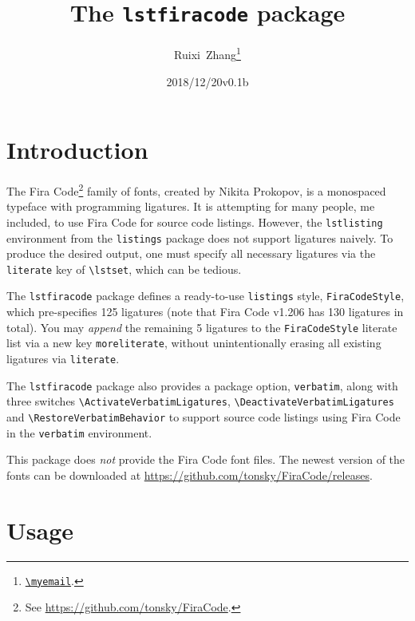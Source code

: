 \documentclass[11pt]{article}
\title{The \texttt{lstfiracode} package}
\author{Ruixi~Zhang\thanks{\href{mailto:\myemail}{\nolinkurl{\myemail}}.}}
\date{2018/12/20\enskip v0.1b}
\begin{document}
\maketitle

\tableofcontents
{}

\section{Introduction}

The Fira Code\footnote{See \url{https://github.com/tonsky/FiraCode}.} family
of fonts, created by Nikita Prokopov, is a monospaced typeface with
programming ligatures.
It is attempting for many people, me included, to use Fira Code for source
code listings.
However, the \verb|lstlisting| environment from the \verb|listings| package
does not support ligatures naively. To produce the desired output, one must
specify all necessary ligatures via the \verb|literate| key
of \verb|\lstset|, which can be tedious.

The \verb|lstfiracode| package defines a ready-to-use \verb|listings| style,
\verb|FiraCodeStyle|, which pre-specifies 125 ligatures
(note that Fira Code v1.206 has 130 ligatures in total).
You may \emph{append} the remaining 5 ligatures to the \verb|FiraCodeStyle|
literate list via a new key \verb|moreliterate|, without unintentionally
erasing all existing ligatures via \verb|literate|.

The \verb|lstfiracode| package also provides a package option,
\verb|verbatim|, along with three switches
\verb|\ActivateVerbatimLigatures|, \verb|\DeactivateVerbatimLigatures|
and \verb|\RestoreVerbatimBehavior|
to support source code listings using Fira Code
in the \verb|verbatim| environment.

This package does \emph{not} provide the Fira Code font files.
The newest version of the fonts can be downloaded at
\url{https://github.com/tonsky/FiraCode/releases}.

\section{Usage}
\end{document}
